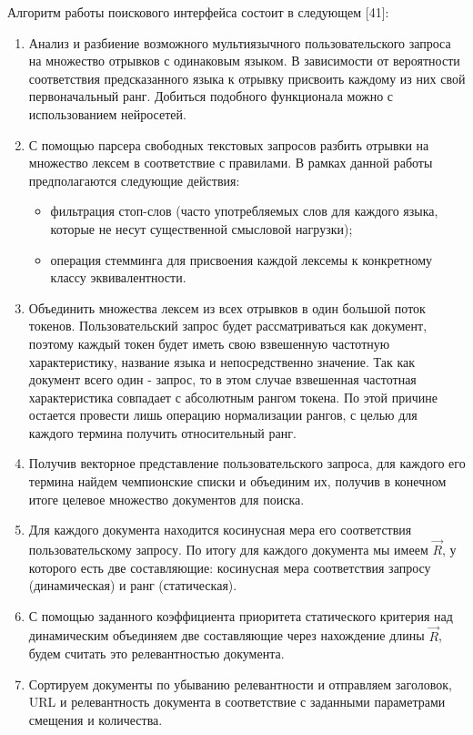 Алгоритм работы поискового интерфейса состоит в следующем [41]:
\begin{enumerate}
\item Анализ и разбиение возможного мультиязычного пользовательского запроса на множество отрывков с одинаковым языком. В зависимости от вероятности соответствия предсказанного языка к отрывку присвоить каждому из них свой первоначальный ранг. Добиться подобного функционала можно с использованием нейросетей.
\item С помощью парсера свободных текстовых запросов разбить отрывки на множество лексем в соответствие с правилами. В рамках данной работы предполагаются следующие действия:
\begin{itemize}
\item фильтрация стоп-слов (часто употребляемых слов для каждого языка, которые не несут существенной смысловой нагрузки);
\item операция стемминга для присвоения каждой лексемы к конкретному классу эквивалентности.
\end{itemize}
\item Объединить множества лексем из всех отрывков в один большой поток токенов. Пользовательский запрос будет рассматриваться как документ, поэтому каждый токен будет иметь свою взвешенную частотную характеристику, название языка и непосредственно значение. Так как документ всего один - запрос, то в этом случае взвешенная частотная характеристика совпадает с абсолютным рангом токена. По этой причине остается провести лишь операцию нормализации рангов, с целью для каждого термина получить относительный ранг.
\item Получив векторное представление пользовательского запроса, для каждого его термина найдем чемпионские списки и объединим их, получив в конечном итоге целевое множество документов для поиска.
\item Для каждого документа находится косинусная мера его соответствия пользовательскому запросу. По итогу для каждого документа мы имеем $\vec{R}$, у которого есть две составляющие: косинусная мера соответствия запросу (динамическая) и ранг (статическая).
\item С помощью заданного коэффициента приоритета статического критерия над динамическим объединяем две составляющие через нахождение длины $\vec{R}$, будем считать это релевантностью документа.
\item Сортируем документы по убыванию релевантности и отправляем заголовок, URL и релевантность документа в соответствие с заданными параметрами смещения и количества.
\end{enumerate}

